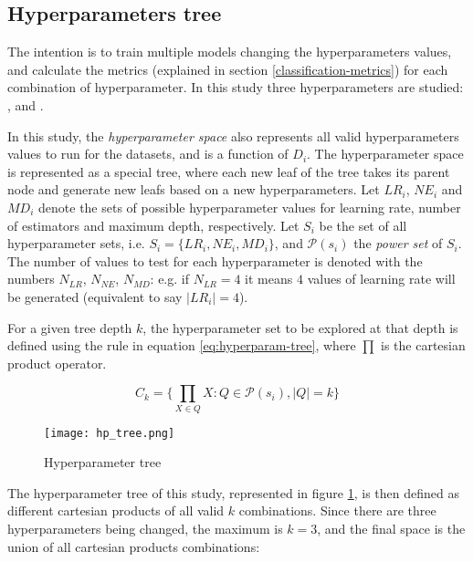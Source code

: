 \subsection{Hyperparameters tree}
\label{subsec:hp-tree}

The intention is to train multiple models changing the hyperparameters values, and calculate the metrics (explained in section \ref{classification-metrics}) for each combination of hyperparameter. In this study three hyperparameters are studied: \textbf{}, \textbf{} and \textbf{}.

In this study, the  \textit{hyperparameter space} also represents all valid hyperparameters values to run for the datasets, and is a function of $D_i$. The hyperparameter space is represented as a special tree, where each new leaf of the tree takes its parent node and generate new leafs based on a new hyperparameters. Let $LR_i$, $NE_i$ and $MD_i$ denote the sets of possible hyperparameter values for learning rate, number of estimators and maximum depth, respectively. Let $S_i$ be the set of all hyperparameter sets, i.e. $S_i = \{LR_i, NE_i, MD_i\}$, and $\mathcal{P}(s_i)$ the \textit{power set} of $S_i$. The number of values to test for each hyperparameter is denoted with the numbers $N_{LR}$, $N_{NE}$, $N_{MD}$: e.g. if $N_{LR} = 4$ it means $4$ values of learning rate will be generated (equivalent to say $|LR_i| = 4$).

For a given tree depth $k$, the hyperparameter set to be explored at that depth is defined using the rule in equation \ref{eq:hyperparam-tree}, where $\prod$ is the cartesian product operator.

\begin{equation}\label{eq:hyperparam-tree}
    C_k = \Big\{\prod_{X \in Q} X : Q \in \mathcal{P}(s_i), |Q| = k\Big\}
\end{equation}


\begin{figure}[!h]
    \centering
    \texttt{[image: hp\_tree.png]} 
    \caption{Hyperparameter tree}
    \label{fig:hp-tree}
\end{figure}

The hyperparameter tree of this study, represented in figure \ref{fig:hp-tree}, is then defined as different cartesian products of all valid $k$ combinations. Since there are three hyperparameters being changed, the maximum is $k=3$, and the final space is the union of all cartesian products combinations:

